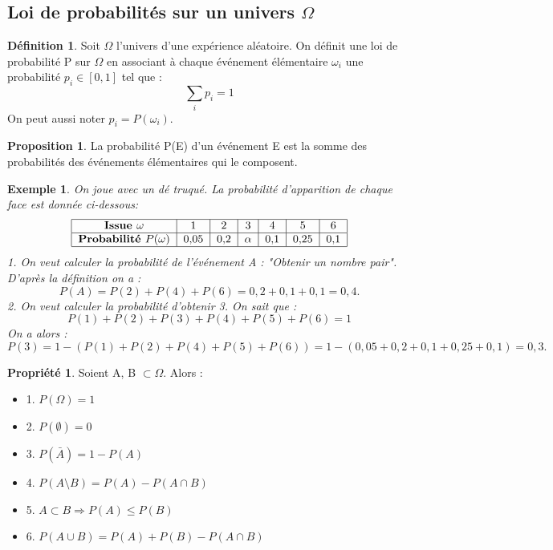 \documentclass[a4paper,12pt]{article}
\newtheorem{Ex}{Exemple}[section]
\theoremstyle{theorem}
\theoremstyle{definition}
\newtheorem{Propriete}{Propriété}[section]
\theoremstyle{definition}
\newtheorem{Propos}{Proposition}[section]
\theoremstyle{definition}
\newtheorem{Def}{Définition}[section]
\begin{document}
	\subsection{Loi de probabilités sur un univers $\Omega$}
	
		\begin{Def}
			Soit $\Omega$ l'univers d'une expérience aléatoire. On définit une loi de probabilité P sur $\Omega$ en associant à chaque événement élémentaire $\omega_{i}$ une probabilité $p_{i} \in [0,1]$ tel que :
			\[\sum_{i}p_{i} = 1\]
			On peut aussi noter $p_{i} = P(\omega_{i})$.
		\end{Def}
		
		\begin{Propos}
			La probabilité P(E) d'un événement E est la somme des probabilités des événements élémentaires qui le composent.
		\end{Propos}
	
		\begin{Ex}
			On joue avec un dé truqué. La probabilité d'apparition de chaque face est donnée ci-dessous: \[
			\begin{tabular}{|c|c|c|c|c|c|c|}
				\hline \textbf{Issue $\omega$} & 1 & 2 & 3 & 4 & 5 & 6 \\
				\hline \textbf{Probabilité $P(\omega)$} & 0,05 & 0,2 & $\alpha$ & 0,1 & 0,25 & 0,1 \\
				\hline
			\end{tabular} \]
			1. On veut calculer la probabilité de l'événement A : "Obtenir un nombre pair". D'après la définition on a :
			\[P(A) = P(2)+P(4)+P(6) = 0,2+0,1+0,1 = 0,4.\]
			2. On veut calculer la probabilité d'obtenir 3. On sait que :
			\[P(1)+P(2)+P(3)+P(4)+P(5)+P(6) = 1\]
			On a alors : 
			\[P(3) = 1 - (P(1)+P(2)+P(4)+P(5)+P(6)) = 1-(0,05+0,2+0,1+0,25+0,1) = 0,3.\]
		\end{Ex}
	
		\begin{Propriete}
			Soient A, B $\subset \Omega$. Alors :
			\begin{itemize}
				\item 1. $P(\Omega) = 1$
				\item 2. $P(\emptyset) = 0$
				\item 3. $P(\bar{A}) = 1-P(A)$
				\item 4. $P(A\setminus B) = P(A)-P(A\cap B)$
				\item 5. $A\subset B \Rightarrow P(A) \leq P(B)$
				\item 6. $P(A\cup B) = P(A)+P(B)-P(A\cap B)$
			\end{itemize}
		\end{Propriete}
	
\end{document}
